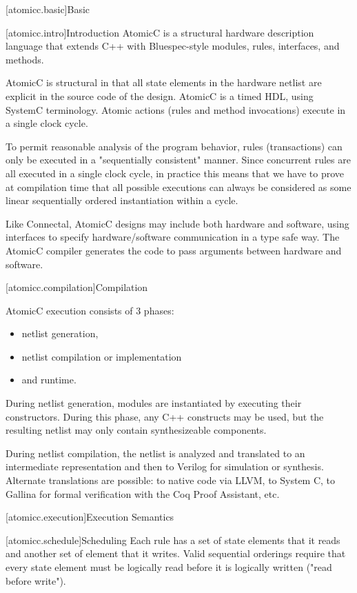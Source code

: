 [atomicc.basic]{Basic}

[atomicc.intro]{Introduction}
AtomicC is a structural hardware description language that extends C++
with Bluespec-style modules, rules, interfaces, and methods.

AtomicC is structural in that all state elements in the hardware
netlist are explicit in the source code of the design. AtomicC is a
timed HDL, using SystemC terminology. 
Atomic actions (rules and method invocations) execute in a single clock cycle.

To permit reasonable analysis of the program behavior, rules (transactions) can only be
executed in a "sequentially consistent" manner.  Since concurrent rules are all executed in a
single clock cycle, in practice this means that we have to prove at compilation time that
all possible executions can always be considered as some linear sequentially ordered instantiation
within a cycle.

Like Connectal, AtomicC designs may include both hardware and
software, using interfaces to specify hardware/software communication
in a type safe way. The AtomicC compiler generates the code to pass
arguments between hardware and software.

[atomicc.compilation]{Compilation}

AtomicC execution consists of 3 phases:
\begin{itemize}
\item netlist generation, 
\item netlist compilation or implementation
\item and runtime.
\end{itemize}

During netlist
generation, modules are instantiated by executing their
constructors. During this phase, any C++ constructs may be used, but
the resulting netlist may only contain synthesizeable components.

During netlist compilation, the netlist is analyzed and translated to
an intermediate representation and then to Verilog for simulation or
synthesis. Alternate translations are possible: to native code via
LLVM, to System C, to Gallina for formal verification with the Coq
Proof Assistant, etc.

[atomicc.execution]{Execution Semantics}

[atomicc.schedule]{Scheduling}
Each rule has a set of state elements that it reads and another set of element that it writes.
Valid sequential orderings require that every state element must be logically read before it is logically
written ("read before write").

